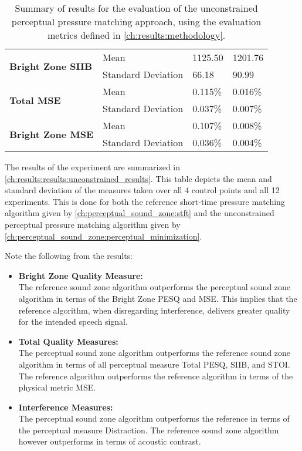 \begin{table}[]
\begin{tabular}{|l|l|l|l|}
\multirow{2}{*}{\textbf{Bright Zone SIIB}}  & Mean               & 1125.50                           & 1201.76            \\
                                            & Standard Deviation & 66.18                             & 90.99              \\ \hline
\multirow{2}{*}{\textbf{Total MSE}}         & Mean               & 0.115\%                           & 0.016\%            \\
                                            & Standard Deviation & 0.037\%                           & 0.007\%            \\ \hline
\multirow{2}{*}{\textbf{Bright Zone MSE}}   & Mean               & 0.107\%                           & 0.008\%            \\
                                            & Standard Deviation & 0.036\%                           & 0.004\%            \\ \hline
\end{tabular}
\caption{
    Summary of results for the evaluation of the unconstrained perceptual pressure matching approach,
    using the evaluation metrics defined in \autoref{ch:results:methodology}.
}
\label{ch:results:results:unconstrained_results}
\end{table}

The results of the experiment are summarized in \autoref{ch:results:results:unconstrained_results}.
This table depicts the mean and standard deviation of the measures taken over all 4 control points and all 12 experiments.
This is done for both the reference short-time pressure matching algorithm given by \autoref{ch:perceptual_sound_zone:stft} and the unconstrained perceptual 
pressure matching algorithm given by \autoref{ch:perceptual_sound_zone:perceptual_minimization}.

Note the following from the results:
\begin{itemize}
    \item \textbf{Bright Zone Quality Measure:}\\
        The reference sound zone algorithm outperforms the perceptual sound zone algorithm in terms of the Bright Zone PESQ and MSE.
        This implies that the reference algorithm, when disregarding interference, delivers greater quality for the intended speech signal.
    \item \textbf{Total Quality Measures:}\\
        The perceptual sound zone algorithm outperforms the reference sound zone algorithm in terms of all perceptual measure Total PESQ, SIIB, and STOI.
        The reference algorithm outperforms the reference algorithm in terms of the physical metric MSE.
    \item \textbf{Interference Measures:}\\
        The perceptual sound zone algorithm outperforms the reference in terms of the perceptual measure Distraction.
        The reference sound zone algorithm however outperforms in terms of acoustic contrast.
\end{itemize}

